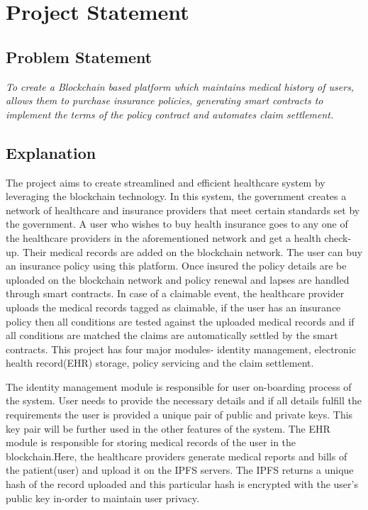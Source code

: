\chapter{Project Statement}

\section{Problem Statement}

\textit{To create a Blockchain based platform which maintains medical history of users, allows them to purchase insurance policies, generating smart contracts to implement the terms of the policy contract and automates claim settlement.}
\section{Explanation}
The project aims to create streamlined and efficient healthcare system by leveraging the blockchain technology. In this system, the government creates a network of healthcare and insurance providers that meet certain standards set by the government. A user who wishes to buy health insurance goes to any one of the healthcare providers in the aforementioned network and get a health check-up. Their medical records are added on the blockchain network. The user can buy an insurance policy using this platform. Once insured the policy details are be uploaded on the blockchain network and policy renewal and lapses are handled through smart contracts. In case of a claimable event, the healthcare provider uploads the medical records tagged as claimable, if the user has an insurance policy then all conditions are tested against the uploaded medical records and if all conditions are matched the claims are automatically settled by the smart contracts.
\newline
This project has four major modules- identity management, electronic health record(EHR) storage, policy servicing and the claim settlement.
        
The identity management module is responsible for user on-boarding process of the system. User needs to provide the necessary details and if all details fulfill the requirements the user is provided a unique pair of public and private keys. This key pair will be further used in the other features of the system.
\newline
The EHR module is responsible for storing medical records of the user in the blockchain.Here, the healthcare providers generate medical reports and bills of the patient(user) and upload it on the IPFS servers. The IPFS returns a unique hash of the record uploaded and this particular hash is encrypted with the user’s public key in-order to maintain user privacy.
        
